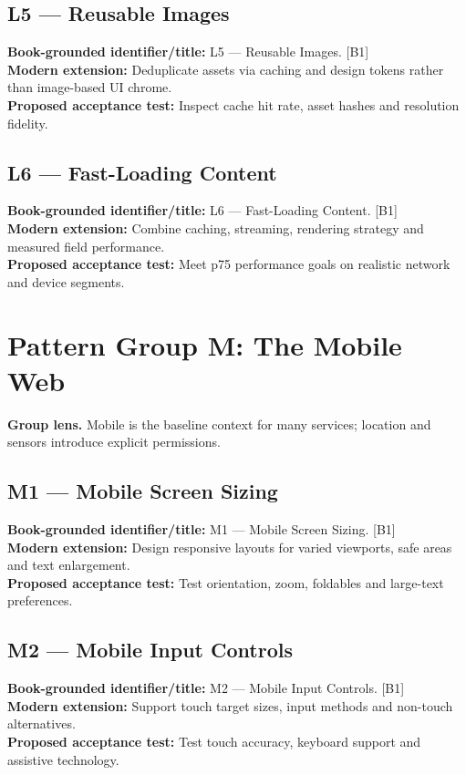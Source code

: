 \documentclass[11pt]{article}
\begin{document}
\subsection{L5 — Reusable Images}
\noindent\textcolor{Ocean}{\textbf{Book-grounded identifier/title:}} L5 — Reusable Images. [B1]\\
\textcolor{Mint}{\textbf{Modern extension:}} Deduplicate assets via caching and design tokens rather than image-based UI chrome.\\
\textcolor{Amber}{\textbf{Proposed acceptance test:}} Inspect cache hit rate, asset hashes and resolution fidelity.\medskip
\subsection{L6 — Fast-Loading Content}
\noindent\textcolor{Ocean}{\textbf{Book-grounded identifier/title:}} L6 — Fast-Loading Content. [B1]\\
\textcolor{Mint}{\textbf{Modern extension:}} Combine caching, streaming, rendering strategy and measured field performance.\\
\textcolor{Amber}{\textbf{Proposed acceptance test:}} Meet p75 performance goals on realistic network and device segments.\medskip
\section{Pattern Group M: The Mobile Web}

\begin{notebox}\textbf{Group lens.} Mobile is the baseline context for many services; location and sensors introduce explicit permissions.\end{notebox}
\subsection{M1 — Mobile Screen Sizing}
\noindent\textcolor{Ocean}{\textbf{Book-grounded identifier/title:}} M1 — Mobile Screen Sizing. [B1]\\
\textcolor{Mint}{\textbf{Modern extension:}} Design responsive layouts for varied viewports, safe areas and text enlargement.\\
\textcolor{Amber}{\textbf{Proposed acceptance test:}} Test orientation, zoom, foldables and large-text preferences.\medskip
\subsection{M2 — Mobile Input Controls}
\noindent\textcolor{Ocean}{\textbf{Book-grounded identifier/title:}} M2 — Mobile Input Controls. [B1]\\
\textcolor{Mint}{\textbf{Modern extension:}} Support touch target sizes, input methods and non-touch alternatives.\\
\textcolor{Amber}{\textbf{Proposed acceptance test:}} Test touch accuracy, keyboard support and assistive technology.\medskip
\end{document}
